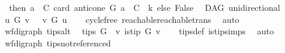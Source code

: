 \begin{isabellebody}
\ \ \ then\ {\isacharparenleft}{\kern0pt}{\isasymforall}a\ {\isasymin}\ C{\isachardot}{\kern0pt}\ card\ {\isacharparenleft}{\kern0pt}{\isacharparenleft}{\kern0pt}anticone\ G\ a{\isacharparenright}{\kern0pt}\ {\isasyminter}\ C{\isacharparenright}{\kern0pt}\ {\isasymle}\ k{\isacharparenright}{\kern0pt}\ else\ False{\isacharparenright}{\kern0pt}{\isachardoublequoteclose}%
\isadelimdocument
%
\endisadelimdocument
%
\isatagdocument
%
\isamarkuptrue%
%
\endisatagdocument
{\isafolddocument}%
%
\isadelimdocument
%
\endisadelimdocument
{}\isamarkupfalse%
\ {\isacharparenleft}{\kern0pt}\ DAG{\isacharparenright}{\kern0pt}\ unidirectional{\isacharcolon}{\kern0pt}\isanewline
\ \ {\isachardoublequoteopen}u\ {\isasymrightarrow}\isactrlsup {\isacharplus}{\kern0pt}\isactrlbsub G\isactrlesub \ v\ {\isasymlongrightarrow}\ {\isasymnot}{\isacharparenleft}{\kern0pt}\ v\ {\isasymrightarrow}\isactrlsup {\isacharasterisk}{\kern0pt}\isactrlbsub G\isactrlesub \ u{\isacharparenright}{\kern0pt}{\isachardoublequoteclose}\isanewline
%
\isadelimproof
\ \ %
\endisadelimproof
%
\isatagproof
{}\isamarkupfalse%
\ cycle{\isacharunderscore}{\kern0pt}free\ reachable{}{\isacharunderscore}{\kern0pt}reachable{\isacharunderscore}{\kern0pt}trans\ \isamarkupfalse%
\ auto%
\endisatagproof
{\isafoldproof}%
%
\isadelimproof
%
\endisadelimproof
%
\isadelimdocument
%
\endisadelimdocument
%
\isatagdocument
%
\isamarkuptrue%
%
\endisatagdocument
{\isafolddocument}%
%
\isadelimdocument
%
\endisadelimdocument
{}\isamarkupfalse%
\ {\isacharparenleft}{\kern0pt}\ wf{\isacharunderscore}{\kern0pt}digraph{\isacharparenright}{\kern0pt}\ tips{\isacharunderscore}{\kern0pt}alt{\isacharcolon}{\kern0pt}\isanewline
\ \ {\isachardoublequoteopen}tips\ G\ {\isacharequal}{\kern0pt}\ {\isacharbraceleft}{\kern0pt}v{\isachardot}{\kern0pt}\ is{\isacharunderscore}{\kern0pt}tip\ G\ v{\isacharbraceright}{\kern0pt}{\isachardoublequoteclose}\isanewline
%
\isadelimproof
\ \ %
\endisadelimproof
%
\isatagproof
{}\isamarkupfalse%
\ tips{\isacharunderscore}{\kern0pt}def\ is{\isacharunderscore}{\kern0pt}tip{\isachardot}{\kern0pt}simps\ \isamarkupfalse%
\ auto%
\endisatagproof
{\isafoldproof}%
%
\isadelimproof
\isanewline
%
\endisadelimproof
\isanewline
{}\isamarkupfalse%
\ {\isacharparenleft}{\kern0pt}\ wf{\isacharunderscore}{\kern0pt}digraph{\isacharparenright}{\kern0pt}\ tips{\isacharunderscore}{\kern0pt}not{\isacharunderscore}{\kern0pt}referenced{\isacharcolon}{\kern0pt}\isanewline

\end{isabellebody}
